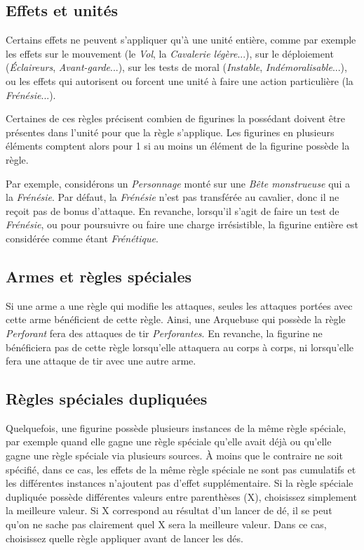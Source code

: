 \subsection{Effets et unités}

Certains effets ne peuvent s'appliquer qu'à une unité entière, comme par exemple les effets sur le mouvement (le \emph{Vol}, la \emph{Cavalerie légère}...), sur le déploiement (\emph{Éclaireurs}, \emph{Avant-garde}...), sur les tests de moral (\emph{Instable}, \emph{Indémoralisable}...), ou les effets qui autorisent ou forcent une unité à faire une action particulière (la \emph{Frénésie}...).

Certaines de ces règles précisent combien de figurines la possédant doivent être présentes dans l'unité pour que la règle s'applique. Les figurines en plusieurs éléments comptent alors pour 1 si au moins un élément de la figurine possède la règle.

Par exemple, considérons un \emph{Personnage} monté sur une \emph{Bête monstrueuse} qui a la \emph{Frénésie}. Par défaut, la \emph{Frénésie} n'est pas transférée au cavalier, donc il ne reçoit pas de bonus d'attaque. En revanche, lorsqu'il s'agit de faire un test de \emph{Frénésie}, ou pour poursuivre ou faire une charge irrésistible, la figurine entière est considérée comme étant \emph{Frénétique}.

\subsection{Armes et règles spéciales}

Si une arme a une règle qui modifie les attaques, seules les attaques portées avec cette arme bénéficient de cette règle. Ainsi, une Arquebuse qui possède la règle \emph{Perforant} fera des attaques de tir \emph{Perforantes}. En revanche, la figurine ne bénéficiera pas de cette règle lorsqu'elle attaquera au corps à corps, ni lorsqu'elle fera une attaque de tir avec une autre arme.

\subsection{Règles spéciales dupliquées}

Quelquefois, une figurine possède plusieurs instances de la même règle spéciale, par exemple quand elle gagne une règle spéciale qu'elle avait déjà ou qu'elle gagne une règle spéciale via plusieurs sources. À moins que le contraire ne soit spécifié, dans ce cas, les effets de la même règle spéciale ne sont pas cumulatifs et les différentes instances n'ajoutent pas d'effet supplémentaire. Si la règle spéciale dupliquée possède différentes valeurs entre parenthèses (X), choisissez simplement la meilleure valeur. Si X correspond au résultat d'un lancer de dé, il se peut qu'on ne sache pas clairement quel X sera la meilleure valeur. Dans ce cas, choisissez quelle règle appliquer avant de lancer les dés.

